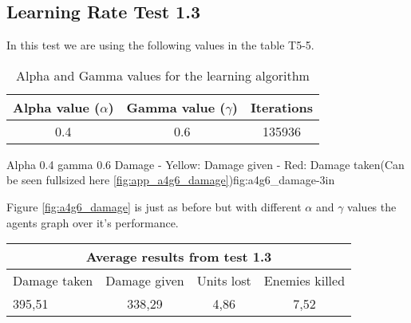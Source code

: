 
\subsection*{Learning Rate Test 1.3}
In this test we are using the following values in the table T5-5.


\begin{table}[H]
\begin{centering}
 \begin{tabular}{|c|c|c|}
	\hline
		Alpha value ($\alpha$) & Gamma value ($\gamma$) & Iterations\\
	\hline
		0.4 & 0.6 & 135936 \\
	\hline
\end{tabular}
\label{a4g6_table}
\caption{Alpha and Gamma values for the learning algorithm}

\end{centering}
\end{table}

			{Alpha 0.4 gamma 0.6 Damage - Yellow: Damage given - Red: Damage taken(Can be seen fullsized here \ref{fig:app_a4g6_damage})}{fig:a4g6_damage}{-3in}

Figure \ref{fig:a4g6_damage} is just as before but with different $\alpha$ and $\gamma$ values the agents graph over it's performance.




\begin{table}
\begin{centering}

 \begin{tabular}{|l|c|c|c|}
	\multicolumn{4}{c}{Average results from test 1.3} \\
	\hline
		Damage taken & Damage given & Units lost & Enemies killed\\
	\hline
		395,51 & 338,29 & 4,86 & 7,52 \\
	\hline
\end{tabular}
\label{test1.3}
\end{centering}
\end{table}
\newpage

